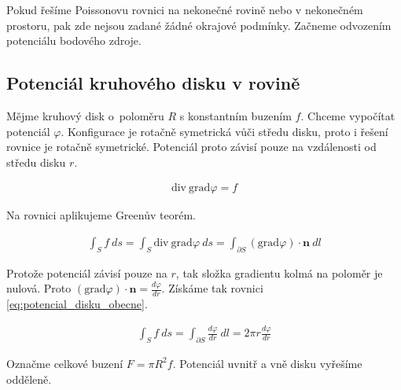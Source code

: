 \documentclass{book}
\newcommand{\vect}[1]{\boldsymbol{#1}}
\newcommand{\grad}{\mathrm{grad}}
\newcommand{\diverg}{\mathrm{div}}
\begin{document}
Pokud řešíme Poissonovu rovnici na nekonečné rovině nebo v nekonečném prostoru, pak zde nejsou zadané žádné okrajové podmínky. Začneme odvozením
potenciálu bodového zdroje.

\subsection{Potenciál kruhového disku v rovině}

Mějme kruhový disk o~poloměru \(R\) s konstantním buzením \(f\). Chceme vypočítat potenciál \(\varphi\). Konfigurace je rotačně symetrická vůči středu
disku, proto i řešení rovnice je rotačně symetrické. Potenciál proto závisí pouze na vzdálenosti od středu disku \(r\).




\begin{equation}
\begin{split}
\diverg \ \grad \varphi = f
\end{split}
\end{equation}

Na rovnici aplikujeme Greenův teorém.

\begin{equation}
\begin{split}
\int_S f \ ds = \int_S \diverg \ \grad \varphi \ ds = \int_{\partial S} (\grad \varphi) \cdot \vect{n} \ dl
\end{split}
\end{equation}

Protože potenciál závisí pouze na \(r\), tak složka gradientu kolmá na poloměr je nulová. Proto \((\grad \varphi) \cdot \vect{n} = \frac{d \varphi}{dr}\).
Získáme tak rovnici \eqref{eq:potencial_disku_obecne}.

\begin{equation}
\label{eq:potencial_disku_obecne}
\begin{split}
\int_S f \ ds = \int_{\partial S} \frac{d \varphi}{dr} \ dl = 2 \pi r \frac{d \varphi}{dr}
\end{split}
\end{equation}

Označme celkové buzení \(F = \pi R^2 f\).
Potenciál uvnitř a vně disku vyřešíme odděleně.
\end{document}
